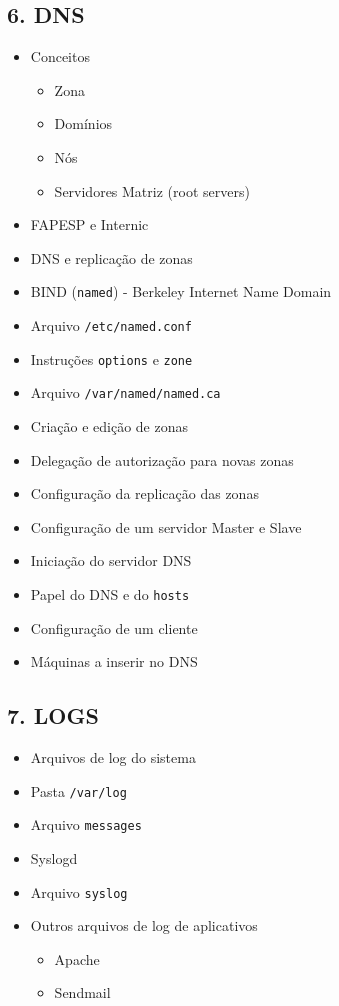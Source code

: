 \documentclass[12pt]{article}
\begin{document}
	\subsection*{6. DNS}
	\begin{itemize}
		\item Conceitos
		\begin{itemize}
			\item Zona
			\item Domínios
			\item Nós
			\item Servidores Matriz (root servers)
		\end{itemize}
		\item FAPESP e Internic
		\item DNS e replicação de zonas
		\item BIND (\texttt{named}) - Berkeley Internet Name Domain
		\item Arquivo \texttt{/etc/named.conf}
		\item Instruções \texttt{options} e \texttt{zone}
		\item Arquivo \texttt{/var/named/named.ca}
		\item Criação e edição de zonas
		\item Delegação de autorização para novas zonas
		\item Configuração da replicação das zonas
		\item Configuração de um servidor Master e Slave
		\item Iniciação do servidor DNS
		\item Papel do DNS e do \texttt{hosts}
		\item Configuração de um cliente
		\item Máquinas a inserir no DNS
	\end{itemize}
	
	\subsection*{7. LOGS}
	\begin{itemize}
		\item Arquivos de log do sistema
		\item Pasta \texttt{/var/log}
		\item Arquivo \texttt{messages}
		\item Syslogd
		\item Arquivo \texttt{syslog}
		\item Outros arquivos de log de aplicativos
		\begin{itemize}
			\item Apache
			\item Sendmail
		\end{itemize}
	\end{itemize}
	
\end{document}
